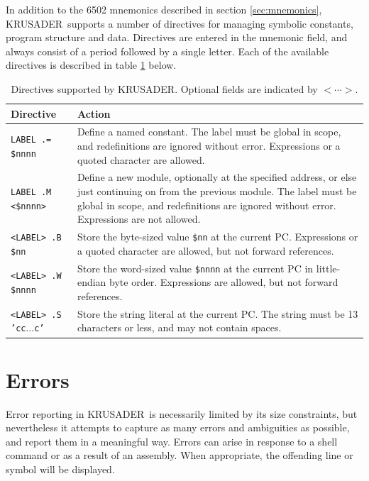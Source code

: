 \documentclass[12pt]{article}
\newcommand{\krusader}{\textsf{KRUSADER}}
\begin{document}
In addition to the 6502 mnemonics described in section \ref{sec:mnemonics}, \krusader\ supports
a number of directives for managing symbolic constants, program structure and data.  
Directives are entered in the mnemonic field, and always consist of a period followed by a single letter.
Each of the available directives is described in table \ref{tab:directives} below.

\begin{table}[htb]
	\centering
	\begin{tabular}{|l|p{10cm}|} \hline
	\textbf{Directive} & \textbf{Action} \tabularnewline
	\hline
	\texttt{LABEL  .=  \$nnnn} & Define a named constant.  The label must be global in scope, 
															and redefinitions are ignored without error.  Expressions or
															a quoted character are allowed.
															\tabularnewline
	\texttt{LABEL  .M  <\$nnnn>} & Define a new module, optionally at the specified address, or else
															just continuing on from the previous module.  The label must be global in scope, 
															and redefinitions are ignored without error.  Expressions are not
															allowed.\tabularnewline
	\texttt{<LABEL> .B  \$nn} & Store the byte-sized value \texttt{\$nn} at the current PC. Expressions or a quoted character are 
															allowed, but not forward references.\tabularnewline
	\texttt{<LABEL> .W  \$nnnn} & Store the word-sized value \texttt{\$nnnn} at the current PC in 
															little-endian byte order. Expressions are 
															allowed, but not forward references.\tabularnewline
	\texttt{<LABEL> .S  'cc$\ldots$c'} & Store the string literal at the current PC.  The string must
															be 13 characters or less, and may not contain spaces.\tabularnewline
	\hline
	\end{tabular}
	\caption{Directives supported by \krusader.  Optional fields are indicated by $<\cdots>$.}
	\label{tab:directives}
\end{table}

\section{Errors}

Error reporting in \krusader\ is necessarily limited by its size constraints,
but nevertheless it attempts to capture as many errors and ambiguities as
possible, and report them in a meaningful way.  Errors can arise in response
to a shell command or as a result of an assembly.  When appropriate, the 
offending line or symbol will be displayed.
\end{document}
